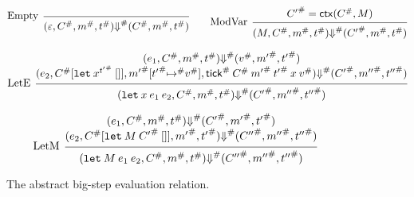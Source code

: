 \documentclass[acmsmall,screen,review]{acmart}
\theoremstyle{definition}
\newcommand*{\A}[1]{{#1}^{\#}}
\newcommand*{\mem}{m}
\newcommand*{\tick}{\mathsf{tick}}
\newcommand*{\modctx}{\mathsf{ctx}}
\begin{document}
\begin{figure}[htb]
  \[
    \begin{prooftree}
      \infer[left label=Empty]0{
      (\varepsilon, \A{C}, \A{\mem}, \A{t})
      \A{\Downarrow}
      (\A{C}, \A{\mem}, \A{t})
      }
    \end{prooftree}\qquad
    \begin{prooftree}
      \hypo{\A{C'}=\modctx(\A{C},M)}
      \infer[left label=ModVar]1{
      (M, \A{C}, \A{\mem}, \A{t})
      \A{\Downarrow}
      (\A{C'}, \A{\mem}, \A{t})
      }
    \end{prooftree}
  \]

  \[
    \begin{prooftree}
      \hypo{
        \begin{matrix}
          (e_{1}, \A{C}, \A{\mem}, \A{t})
          \A\Downarrow
          (\A{v}, \A{\mem'}, \A{t'}) \\
          (e_{2}, \A{C}[\mathtt{let}\:x^{\A{t'}}\:[]], \A{\mem'}[\A{t'}\A{\mapsto} \A{v}], \A{\tick}\:\A{C}\:\A{\mem'}\:\A{t'}\:x\:\A{v})
          \A\Downarrow
          (\A{C'}, \A{\mem''}, \A{t''})
        \end{matrix}
      }
      \infer[left label=LetE]1{
      (\mathtt{let}\:x\:e_1\:e_2, \A{C}, \A{\mem}, \A{t})
      \A\Downarrow
      (\A{C'}, \A{\mem''}, \A{t''})
      }
    \end{prooftree}
  \]

  \[
    \begin{prooftree}
      \hypo{
        \begin{matrix}
          (e_{1}, \A{C}, \A{\mem}, \A{t})
          \A\Downarrow
          (\A{C'}, \A{\mem'}, \A{t'}) \\
          (e_{2}, \A{C}[\mathtt{let}\:M\:\A{C'}\:[]], \A{\mem'}, \A{t'})
          \A\Downarrow
          (\A{C''}, \A{\mem''}, \A{t''})
        \end{matrix}
      }
      \infer[left label=LetM]1{
      (\mathtt{let}\:M\:e_{1}\:e_{2}, \A{C}, \A{\mem}, \A{t})
      \A\Downarrow
      (\A{C''}, \A{\mem''}, \A{t''})
      }
    \end{prooftree}
  \]
  \caption{The abstract big-step evaluation relation.}
  \label{fig:abseval}
\end{figure}
\end{document}
